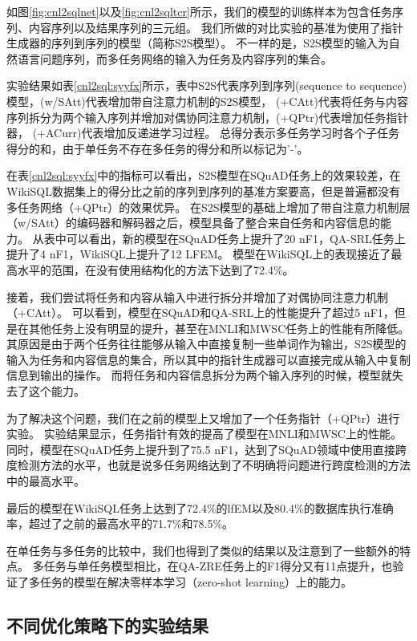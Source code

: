 如图\ref{fig:cnl2sqlnet}以及\ref{fig:cnl2sqltcr}所示，我们的模型的训练样本为包含任务序列、内容序列以及结果序列的三元组。
我们所做的对比实验的基准为使用了指针生成器的序列到序列的模型（简称S2S模型）\cite{See2017Get}。
不一样的是，S2S模型的输入为自然语言问题序列，而多任务网络的输入为任务及内容序列的集合。

实验结果如表\ref{cnl2sql:syyfx}所示，表中S2S代表序列到序列(sequence to sequence)模型，(w/SAtt)代表增加带自注意力机制的S2S模型，
(+CAtt)代表将任务与内容序列拆分为两个输入序列并增加对偶协同注意力机制，(+QPtr)代表增加任务指针器， (+ACurr)代表增加反递进学习过程。
总得分表示多任务学习时各个子任务得分的和，由于单任务不存在多任务的得分和所以标记为’-’。


在表\ref{cnl2sql:syyfx}中的指标可以看出，S2S模型在SQuAD任务上的效果较差，在WikiSQL数据集上的得分比之前的序列到序列的基准方案要高，但是普遍都没有多任务网络（+QPtr）的效果优异。
在S2S模型的基础上增加了带自注意力机制层（w/SAtt）的编码器和解码器之后\cite{vaswani2017attention}，模型具备了整合来自任务和内容信息的能力。
从表中可以看出，新的模型在SQuAD任务上提升了20 nF1，QA-SRL任务上提升了4 nF1，WikiSQL上提升了12 LFEM。
模型在WikiSQL上的表现接近了最高水平的范围，在没有使用结构化的方法\cite{dong2018coarse,huang2018natural,yu2018typesql}下达到了72.4\%。

接着，我们尝试将任务和内容从输入中进行拆分并增加了对偶协同注意力机制（+CAtt）。
可以看到，模型在SQuAD和QA-SRL上的性能提升了超过5 nF1，但是在其他任务上没有明显的提升，甚至在MNLI和MWSC任务上的性能有所降低。
其原因是由于两个任务往往能够从输入中直接复制一些单词作为输出，S2S模型的输入为任务和内容信息的集合，所以其中的指针生成器可以直接完成从输入中复制信息到输出的操作。
而将任务和内容信息拆分为两个输入序列的时候，模型就失去了这个能力。

为了解决这个问题，我们在之前的模型上又增加了一个任务指针（+QPtr）进行实验。
实验结果显示，任务指针有效的提高了模型在MNLI和MWSC上的性能。
同时，模型在SQuAD任务上提升到了75.5 nF1，达到了SQuAD领域中使用直接跨度检测方法的水平，也就是说多任务网络达到了不明确将问题进行跨度检测的方法中的最高水平。

最后的模型在WikiSQL任务上达到了72.4\%的lfEM以及80.4\%的数据库执行准确率，超过了之前的最高水平\cite{dong2018coarse}的71.7\%和78.5\%。

在单任务与多任务的比较中，我们也得到了类似的结果以及注意到了一些额外的特点。
多任务与单任务模型相比，在QA-ZRE任务上的F1得分又有11点提升，也验证了多任务的模型在解决零样本学习（zero-shot learning）上的能力。

\subsection{不同优化策略下的实验结果}

